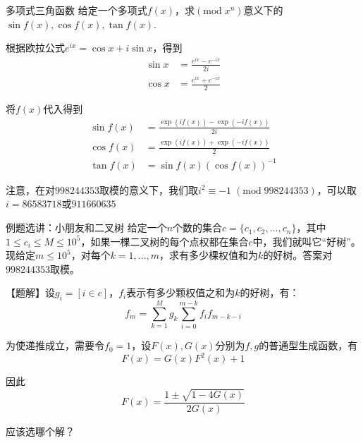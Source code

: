 \documentclass{beamer}
\begin{document}
\begin{frame}{多项式三角函数}
    \small
    给定一个多项式$f(x)$，求$(\text{mod}\; x^n)$意义下的$\sin f(x),\cos f(x),\tan f(x)$.
    
    \vspace{1em}\pause
    根据欧拉公式$e^{ix}=\cos x + i \sin x$，得到
    \begin{align*}
        \sin x &= \frac{e^{ix}-e^{-ix}}{2i}\\
        \cos x &= \frac{e^{ix}+e^{-ix}}{2}
    \end{align*}

    \pause 将$f(x)$代入得到
    \begin{align*}
        \sin f(x) &= \frac{\exp{(if(x))}-\exp{(-if(x))}}{2i}\\
        \cos f(x) &= \frac{\exp{(if(x))}+\exp{(-if(x))}}{2}\\
        \tan f(x) &= \sin f(x) \left(\cos f(x)\right)^{-1}
    \end{align*}

    \pause
    注意，在对$998244353$取模的意义下，我们取$i^2\equiv -1\;(\text{mod}\; 998244353)$，可以取$i=86583718$或$911660635$
\end{frame}

\begin{frame}{例题选讲：小朋友和二叉树}
    \small
    给定一个$n$个数的集合$c=\{c_1,c_2,...,c_n\}$，其中$1\leq c_i\leq M \leq 10^5$，如果一棵二叉树的每个点权都在集合$c$中，我们就叫它“好树”。现给定$m\leq 10^5$，对每个$k=1,...,m$，求有多少棵权值和为$k$的好树。答案对$998244353$取模。

    \vspace{1em}\pause
    【题解】设$g_i=[i\in c]$，$f_i$表示有多少颗权值之和为$k$的好树，有：
    \begin{equation*}
        f_m=\sum_{k=1}^M g_k \sum_{i=0}^{m-k} f_i f_{m-k-i}
    \end{equation*}

    为使递推成立，需要令$f_0=1$\pause ，设$F(x),G(x)$分别为$f,g$的普通型生成函数，有
    \begin{equation*}
        F(x)=G(x)F^2(x)+1
    \end{equation*}

    \pause
    因此
    \begin{equation*}
        F(x)=\frac{1\pm \sqrt{1-4G(x)}}{2G(x)}
    \end{equation*}

    应该选哪个解？
\end{frame}
\end{document}
